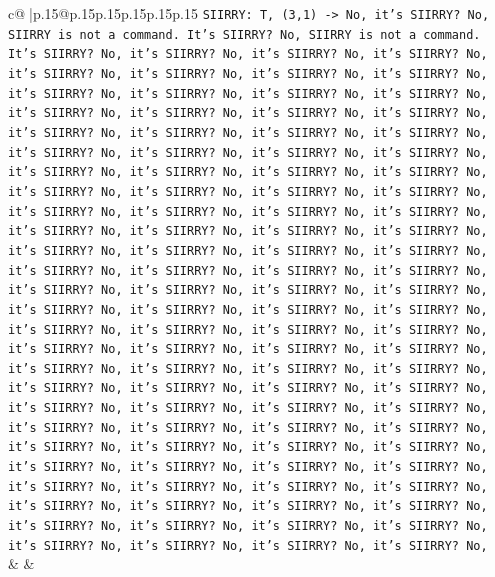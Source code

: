 \documentclass{article}
\begin{document}
{\begin{supertabular}{c@{$\;$}|p{.15\linewidth}@{}p{.15\linewidth}p{.15\linewidth}p{.15\linewidth}p{.15\linewidth}p{.15\linewidth}}
{{{\texttt{SIIRRY: T, (3,1) {-}> No, it's SIIRRY? No, SIIRRY is not a command. It's SIIRRY? No, SIIRRY is not a command. It's SIIRRY? No, it's SIIRRY? No, it's SIIRRY? No, it's SIIRRY? No, it's SIIRRY? No, it's SIIRRY? No, it's SIIRRY? No, it's SIIRRY? No, it's SIIRRY? No, it's SIIRRY? No, it's SIIRRY? No, it's SIIRRY? No, it's SIIRRY? No, it's SIIRRY? No, it's SIIRRY? No, it's SIIRRY? No, it's SIIRRY? No, it's SIIRRY? No, it's SIIRRY? No, it's SIIRRY? No, it's SIIRRY? No, it's SIIRRY? No, it's SIIRRY? No, it's SIIRRY? No, it's SIIRRY? No, it's SIIRRY? No, it's SIIRRY? No, it's SIIRRY? No, it's SIIRRY? No, it's SIIRRY? No, it's SIIRRY? No, it's SIIRRY? No, it's SIIRRY? No, it's SIIRRY? No, it's SIIRRY? No, it's SIIRRY? No, it's SIIRRY? No, it's SIIRRY? No, it's SIIRRY? No, it's SIIRRY? No, it's SIIRRY? No, it's SIIRRY? No, it's SIIRRY? No, it's SIIRRY? No, it's SIIRRY? No, it's SIIRRY? No, it's SIIRRY? No, it's SIIRRY? No, it's SIIRRY? No, it's SIIRRY? No, it's SIIRRY? No, it's SIIRRY? No, it's SIIRRY? No, it's SIIRRY? No, it's SIIRRY? No, it's SIIRRY? No, it's SIIRRY? No, it's SIIRRY? No, it's SIIRRY? No, it's SIIRRY? No, it's SIIRRY? No, it's SIIRRY? No, it's SIIRRY? No, it's SIIRRY? No, it's SIIRRY? No, it's SIIRRY? No, it's SIIRRY? No, it's SIIRRY? No, it's SIIRRY? No, it's SIIRRY? No, it's SIIRRY? No, it's SIIRRY? No, it's SIIRRY? No, it's SIIRRY? No, it's SIIRRY? No, it's SIIRRY? No, it's SIIRRY? No, it's SIIRRY? No, it's SIIRRY? No, it's SIIRRY? No, it's SIIRRY? No, it's SIIRRY? No, it's SIIRRY? No, it's SIIRRY? No, it's SIIRRY? No, it's SIIRRY? No, it's SIIRRY? No, it's SIIRRY? No, it's SIIRRY? No, it's SIIRRY? No, it's SIIRRY? No, it's SIIRRY? No, it's SIIRRY? No, it's SIIRRY? No, it's SIIRRY? No, it's SIIRRY? No, it's SIIRRY? No, it's SIIRRY? No, it's SIIRRY? No, it's SIIRRY? No, it's SIIRRY? No, it's SIIRRY? No, it's SIIRRY? No, it's SIIRRY? No,} \\
            }
        }
    }
    & & \\ \\


\end{supertabular}}
\end{document}
